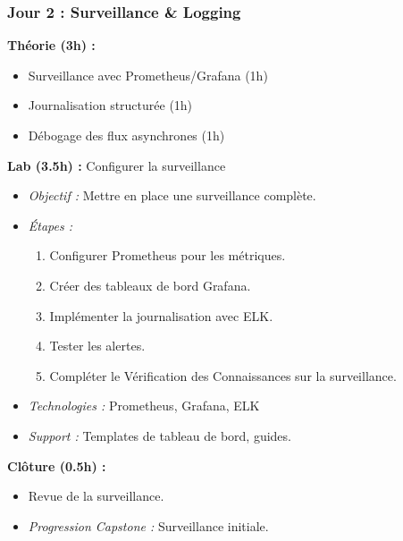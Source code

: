 \documentclass[11pt]{article}
\begin{document}
\subsubsection{Jour 2 : Surveillance \& Logging}
\textbf{Théorie (3h) :}
\begin{itemize}
    \item Surveillance avec Prometheus/Grafana (1h)
    \item Journalisation structurée (1h)
    \item Débogage des flux asynchrones (1h)
\end{itemize}
\textbf{Lab (3.5h) :} Configurer la surveillance
\begin{itemize}
    \item \textit{Objectif :} Mettre en place une surveillance complète.
    \item \textit{Étapes :}
        \begin{enumerate}
            \item Configurer Prometheus pour les métriques.
            \item Créer des tableaux de bord Grafana.
            \item Implémenter la journalisation avec ELK.
            \item Tester les alertes.
            \item Compléter le Vérification des Connaissances sur la surveillance.
        \end{enumerate}
    \item \textit{Technologies :} Prometheus, Grafana, ELK
    \item \textit{Support :} Templates de tableau de bord, guides.
\end{itemize}
\textbf{Clôture (0.5h) :}
\begin{itemize}
    \item Revue de la surveillance.
    \item \textit{Progression Capstone :} Surveillance initiale.
\end{itemize}
\end{document}
